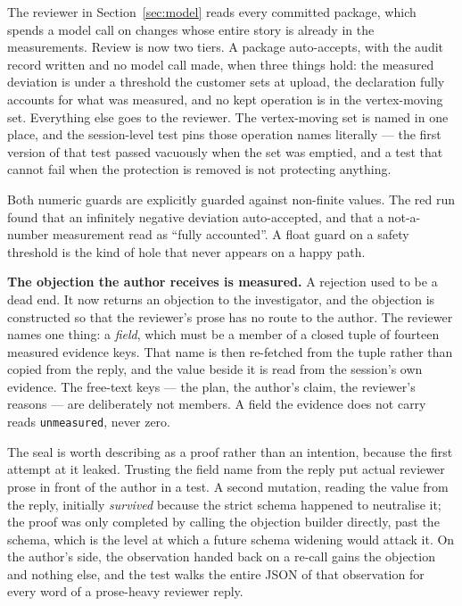 \documentclass[10pt,onecolumn]{article}
\newcommand{\topic}[1]{\textbf{#1.}\hspace{0.5em}\ignorespaces}
\begin{document}
The reviewer in Section~\ref{sec:model} reads every committed package, which spends a model call on
changes whose entire story is already in the measurements. Review is now two tiers. A package
auto-accepts, with the audit record written and no model call made, when three things hold: the
measured deviation is under a threshold the customer sets at upload, the declaration fully accounts
for what was measured, and no kept operation is in the vertex-moving set. Everything else goes to
the reviewer. The vertex-moving set is named in one place, and the session-level test pins those
operation names literally --- the first version of that test passed vacuously when the set was
emptied, and a test that cannot fail when the protection is removed is not protecting anything.

Both numeric guards are explicitly guarded against non-finite values. The red run found that an
infinitely negative deviation auto-accepted, and that a not-a-number measurement read as ``fully
accounted''. A float guard on a safety threshold is the kind of hole that never appears on a happy
path.

\topic{The objection the author receives is measured} A rejection used to be a dead end. It now
returns an objection to the investigator, and the objection is constructed so that the reviewer's
prose has no route to the author. The reviewer names one thing: a \emph{field}, which must be a
member of a closed tuple of fourteen measured evidence keys. That name is then re-fetched from the
tuple rather than copied from the reply, and the value beside it is read from the session's own
evidence. The free-text keys --- the plan, the author's claim, the reviewer's reasons --- are
deliberately not members. A field the evidence does not carry reads \texttt{unmeasured}, never
zero.

The seal is worth describing as a proof rather than an intention, because the first attempt at it
leaked. Trusting the field name from the reply put actual reviewer prose in front of the author in
a test. A second mutation, reading the value from the reply, initially \emph{survived} because the
strict schema happened to neutralise it; the proof was only completed by calling the objection
builder directly, past the schema, which is the level at which a future schema widening would
attack it. On the author's side, the observation handed back on a re-call gains the objection and
nothing else, and the test walks the entire JSON of that observation for every word of a
prose-heavy reviewer reply.
\end{document}
